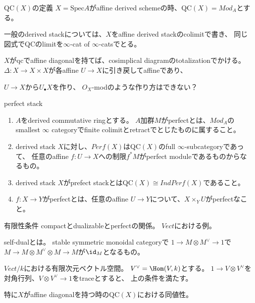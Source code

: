 \documentclass[dvipdfmx]{beamer}
\newcommand{\QC}{\mathrm{QC}}
\newcommand{\spec}{\mathrm{Spec}}
\begin{document}
\begin{frame}{$\QC(X)$の定義}
$X=\spec A$がaffine derived schemeの時、$\QC(X)=Mod_A$とする。

一般のderived stackについては、$X$をaffine derived stackのcolimitで書き、
同じ図式で$\QC$のlimitを$\infty$-cat of $\infty$-catsでとる。

$X$がqcでaffine diagonalを持てば、cosimplical diagramのtotalizationでかける。
$\Delta:X \to X\times X$が各affine $U \to X$に引き戻してaffineであり、

$U \to X$から$U_\bullet X$を作り、
$O_X$-modのような作り方はできない？
\end{frame}

\begin{frame}{perfect stack}
\begin{dfn}
\begin{enumerate}
\item $A$をderived commutative ringとする。
$A$加群$M$がperfectとは、$Mod_A$のsmallest $\infty$ categoryでfinite colimitとretractでとじたものに属すること。
\item derived stack $X$に対し、$Perf(X)$は$\QC(X)$のfull $\infty$-subcategoryであって、
任意のaffine $f:U \to X$への制限$f^*M$がperfect moduleであるものからなるもの。
\item derived stack $X$がprefect stackとは$\QC(X)\cong IndPerf(X)$であること。
\item $f:X \to Y$がperfectとは、任意のaffine $U \to Y$について、$X \times_Y U$がperfectなこと。
\end{enumerate}
\end{dfn}
\end{frame}

\begin{frame}{有限性条件}
compactとdualizableとperfectの関係。
$Vect$における例。

self-dualとは。
stable symmetric monoidal categoryで
$1 \to M\otimes M^\vee \to 1$で$M \to M \otimes M^\vee \otimes M \to M$が$\id_M$となるもの。

$Vect/k$における有限次元ベクトル空間。
$V^\vee = \Hom(V,k)$とする。
$1\to V\otimes V^\vee$を対角行列、$V\otimes V^\vee \to 1$をtraceとすると、
上の条件を満たす。

特に$X$がaffine diagonalを持つ時の$\QC(X)$における同値性。
\end{frame}
\end{document}
